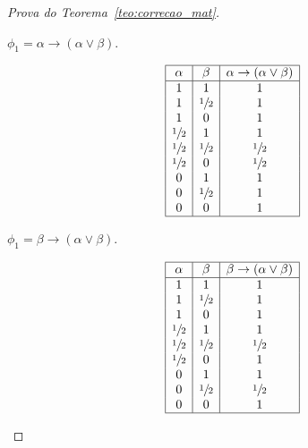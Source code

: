 \begin{proof}[Prova do Teorema~\ref{teo:correcao_mat}]
\begin{provaporcasos}
\begin{provaporsubcasos}
                \subcasodeprova{} $\phi_{1} = \alpha \to (\alpha \lor \beta)$. 

                \begin{center}
                    \[
                        \begin{array}{|c|c|c|}%
                            \hline
                            \alpha      & \beta & \alpha \to (\alpha \lor \beta) \\
                            \hline%
                            1 & 1 &1\\
                            1 & \meio{} &1\\
                            1 & 0 &1\\
                            \meio{} & 1 &1\\
                            \meio{} & \meio{} &\meio{}\\
                            \meio{} & 0 &\meio{}\\
                            0 & 1 &1\\
                            0 & \meio{} &1\\
                            0 & 0 &1\\
                            \hline
                        \end{array}
                    \]
                \end{center}
                
                \subcasodeprova{} $\phi_{1} = \beta \to (\alpha \lor \beta)$.

                \begin{center}
                    \[
                        \begin{array}{|c|c|c|}%
                            \hline
                            \alpha      & \beta & \beta \to (\alpha \lor \beta) \\
                            \hline%
                            1 & 1 &1\\
                            1 & \meio{} &1\\
                            1 & 0 &1\\
                            \meio{} & 1 &1\\
                            \meio{} & \meio{} &\meio{}\\
                            \meio{} & 0 &1\\
                            0 & 1 &1\\
                            0 & \meio{} &\meio{}\\
                            0 & 0 &1\\
                            \hline
                        \end{array}
                    \]
                \end{center}


\end{provaporsubcasos}
\end{provaporcasos}
\end{proof}
